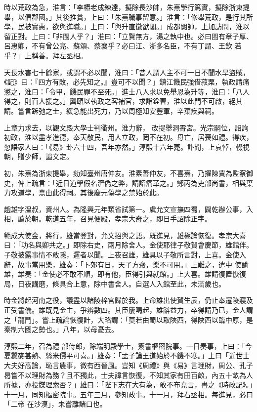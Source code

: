 \begin{pinyinscope}
 時以荒政為急，淮言：「李椿老成練達，擬除長沙帥，朱熹學行篤實，擬除浙東提舉，以倡郡國。」其後推賞，上曰：「朱熹職事留意。」淮言：「修舉荒政，是行其所學，民被實惠，欲與進職。」上曰：「與升直徽猷閣。」成都闕帥，上加訪問，淮以留正對。上曰：「非閩人乎？」淮曰：「立賢無方，湯之執中也。必曰閩有章子厚、呂惠卿，不有曾公亮、蘇頌、蔡襄乎？必曰江、浙多名臣，不有丁謂、王欽
 若乎？」上稱善。拜左丞相。



 天長水害七十餘家，或謂不必以聞，淮曰：「昔人謂人主不可一日不聞水旱盜賊，《記》曰：『四方有敗，必先知之。』豈可不以聞？」鎮江饑民強借菽粟，執政請痛懲之，淮曰：「令甲，饑民罪不至死。」進士八人求以免舉恩為升等，淮曰：「八人得之，則百人援之。」龔頤以執政之客補官，求詣銓曹，淮以此門不可啟，絕其請。嘗言跅弛之士，緩急能出死力，乃以周極知安豐軍，辛棄疾與祠。



 上章力求去，以觀文殿大學士判衢州。淮力辭，
 改提舉洞霄宮。光宗嗣位，詔詢初政，淮以盡孝進德，奉天敬民，用人立政，罔不在初。母亡，居喪如禮。得疾，忽語家人曰：「《易》卦六十四，吾年亦然。」淳熙十六年薨。訃聞，上哀悼，輟視朝，贈少師，謚文定。



 初，朱熹為浙東提舉，劾知臺州唐仲友。淮素善仲友，不喜熹，乃擢陳賈為監察御史，俾上疏言：「近日道學假名濟偽之弊，請詔痛革之。」鄭丙為吏部尚書，相與葉力攻道學，熹由此得祠。其後慶元偽學之禁始於此。



 趙雄字溫叔，資州人。為隆興元年類省試第一。虞允文宣撫四蜀，闢乾辦公事，入相，薦於朝。乾道五年，召見便殿，孝宗大奇之，即日手詔除正字。



 範成大使金，將行，雄當登對，允文招與之語。既進見，雄極論恢復。孝宗大喜曰：「功名與卿共之。」即除右史，兩月除舍人。金使耶律子敬賀會慶節，雄館伴。子敬披露事情不敢隱，邏者以聞。上夜召雄，雄具以子敬所言對，上喜。金使入辭，故事當用樂，雄奏：「卜郊有日，天子方齋，樂不可用。」上難之，遣中
 使諭雄，雄奏：「金使必不敢不順，即有他，臣得引與就館。」上大喜。雄請復置恢復局，日夜講磨，條具合上意，除中書舍人。自選人入館至此，未滿歲也。



 時金將起河南之役，議盡以諸陵梓宮歸於我。上命雄出使賀生辰，仍止奉遷陵寢及正受書儀。雄既見金主，爭辨數四。其臣屢喝起，雄辭益力，卒得請乃已，金人謂之「龍鬥」。嘗上疏論恢復計，大略謂：「莫若由蜀以取陜西，得陜西以臨中原，是秦制六國之勢也。」八年，以母憂去。



 淳熙二年，召為禮
 部侍郎，除端明殿學士，簽書樞密院事。一日奏事，上曰：「今夏蠶麥甚熟、絲米價平可喜。」雄奏：「孟子論王道始於不饑不寒。」上曰「近世士大夫好高論，恥言農事，微有西晉風。豈知《周禮》與《易》言理財，周公、孔子曷嘗不以理財為務？且不獨此，士夫諱言恢復，不知其家有田百畝，內五十畝為人所據，亦投牒理索否？」雄曰：「陛下志在大有為，敢不布堯言，書之《時政記》。」十一月，同知樞密院事。五年三月，參知政事。十一月，拜右丞相。每進見，必曰「二帝
 在沙漠」，未嘗離諸口也。




\end{pinyinscope}
